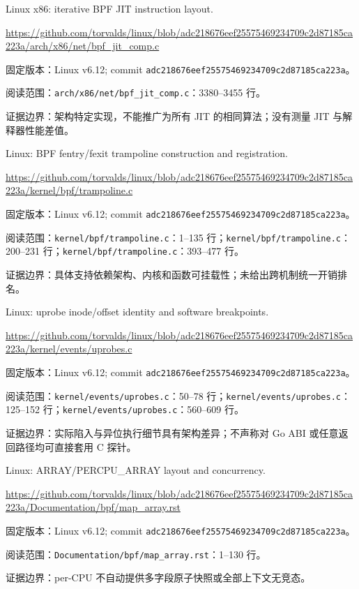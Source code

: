 \documentclass[UTF8,fontset=fandol,openany,11pt]{ctexbook}
\begin{document}
\begin{thebibliography}{999}
 Linux x86: iterative BPF JIT instruction layout.\par
\url{https://github.com/torvalds/linux/blob/adc218676eef25575469234709c2d87185ca223a/arch/x86/net/bpf_jit_comp.c}\par
{\small\raggedright 固定版本：Linux v6.12; commit \texttt{adc21867\allowbreak{}6eef2557\allowbreak{}54692347\allowbreak{}09c2d871\allowbreak{}85ca223a}。\par
阅读范围：\nolinkurl{arch/x86/net/bpf_jit_comp.c}：3380–3455 行。\par
证据边界：架构特定实现，不能推广为所有 JIT 的相同算法；没有测量 JIT 与解释器性能差值。
}

 Linux: BPF fentry/fexit trampoline construction and registration.\par
\url{https://github.com/torvalds/linux/blob/adc218676eef25575469234709c2d87185ca223a/kernel/bpf/trampoline.c}\par
{\small\raggedright 固定版本：Linux v6.12; commit \texttt{adc21867\allowbreak{}6eef2557\allowbreak{}54692347\allowbreak{}09c2d871\allowbreak{}85ca223a}。\par
阅读范围：\nolinkurl{kernel/bpf/trampoline.c}：1–135 行；\nolinkurl{kernel/bpf/trampoline.c}：200–231 行；\nolinkurl{kernel/bpf/trampoline.c}：393–477 行。\par
证据边界：具体支持依赖架构、内核和函数可挂载性；未给出跨机制统一开销排名。
}

 Linux: uprobe inode/offset identity and software breakpoints.\par
\url{https://github.com/torvalds/linux/blob/adc218676eef25575469234709c2d87185ca223a/kernel/events/uprobes.c}\par
{\small\raggedright 固定版本：Linux v6.12; commit \texttt{adc21867\allowbreak{}6eef2557\allowbreak{}54692347\allowbreak{}09c2d871\allowbreak{}85ca223a}。\par
阅读范围：\nolinkurl{kernel/events/uprobes.c}：50–78 行；\nolinkurl{kernel/events/uprobes.c}：125–152 行；\nolinkurl{kernel/events/uprobes.c}：560–609 行。\par
证据边界：实际陷入与异位执行细节具有架构差异；不声称对 Go ABI 或任意返回路径均可直接套用 C 探针。
}

 Linux: ARRAY/PERCPU\_ARRAY layout and concurrency.\par
\url{https://github.com/torvalds/linux/blob/adc218676eef25575469234709c2d87185ca223a/Documentation/bpf/map_array.rst}\par
{\small\raggedright 固定版本：Linux v6.12; commit \texttt{adc21867\allowbreak{}6eef2557\allowbreak{}54692347\allowbreak{}09c2d871\allowbreak{}85ca223a}。\par
阅读范围：\nolinkurl{Documentation/bpf/map_array.rst}：1–130 行。\par
证据边界：per-CPU 不自动提供多字段原子快照或全部上下文无竞态。
}


\end{thebibliography}
\end{document}
